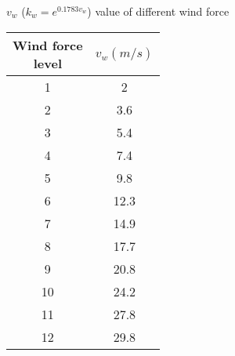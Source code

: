 \begin{center}
    \begin{threeparttable}
        \caption{$v_w$ ($k_w = e^{0.1783v_w}$) value of different wind force}
        \begin{tabular}{cc}
            \hline
            \thead{Wind force\\ level} & $v_w(m/s)$\\
            \hline
            1 & 2 \\
            2 & 3.6\\
            3 & 5.4\\
            4 & 7.4\\
            5 & 9.8\\
            6 & 12.3\\
            7 & 14.9\\
            8 & 17.7\\
            9 & 20.8\\
            10 & 24.2\\
            11 & 27.8\\
            12 & 29.8\\
            \hline
        \end{tabular}
        \label{tab:vw}
    \end{threeparttable}

\end{center}


